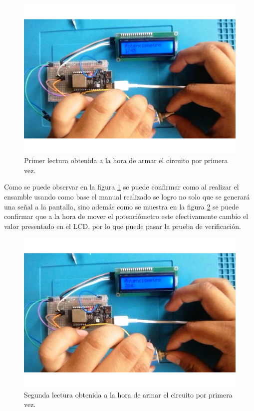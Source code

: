                 \begin{figure}[H]
        \centering
        \includegraphics[trim = {50mm 20mm 0mm 0mm},clip,scale=0.3]{19/Img/evidenciaCambio1.pdf}
        \caption{Primer lectura obtenida a la hora de armar el circuito por primera vez.}
        \label{fig:evidenciaCambio1}
    \end{figure}
    Como se puede observar en la figura \ref{fig:evidenciaCambio1} se puede confirmar como al realizar el ensamble usando como base el manual realizado se logro no solo que se generará una señal a la pantalla, sino además como se muestra en la figura \ref{fig:evidenciaCambio2} se puede confirmar que a la hora de mover el potenciómetro este efectivamente cambio el valor presentado en el LCD, por lo que puede pasar la prueba de verificación.
                    \begin{figure}[H]
        \centering
        \includegraphics[trim = {50mm 20mm 0mm 0mm},clip,scale=0.3]{19/Img/evidenciaCambio2.pdf}
        \caption{Segunda lectura obtenida a la hora de armar el circuito por primera vez.}
        \label{fig:evidenciaCambio2}
    \end{figure}
